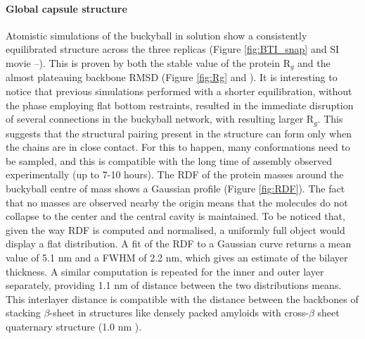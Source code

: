 \paragraph{Global capsule structure} Atomistic simulations of the buckyball in solution show a consistently equilibrated structure across the three replicas (Figure \ref{fig:BTI_snap} and SI movie --).
%
This is proven by both the stable value of the protein R$_g$ and the almost plateauing backbone RMSD (Figure \ref{fig:Rg} and ). It is interesting to notice that previous simulations performed with a shorter equilibration, without the phase employing flat bottom restraints, resulted in the immediate disruption of several connections in the buckyball network, with resulting larger R$_g$. This suggests that the structural pairing present in the structure can form only when the chains are in close contact. For this to happen, many conformations need to be sampled, and this is compatible with the long time of assembly observed experimentally (up to 7-10 hours).
%
The RDF of the protein masses around the buckyball centre of mass shows a Gaussian profile (Figure \ref{fig:RDF}). The fact that no masses are observed nearby the origin means that the molecules do not collapse to the center and the central cavity is maintained. To be noticed that, given the way RDF is computed and normalised, a uniformly full object would display a flat distribution.
%
A fit of the RDF to a Gaussian curve returns a mean value of 5.1 nm and a FWHM of 2.2 nm, which gives an estimate of the bilayer thickness.
%
A similar computation is repeated for the inner and outer layer separately, providing 1.1 nm of distance between the two distributions means. This interlayer distance is compatible with the distance between the backbones of stacking $\beta$-sheet in structures like densely packed amyloids with cross-$\beta$ sheet quaternary structure (1.0 nm \cite{Sunde1997}).


